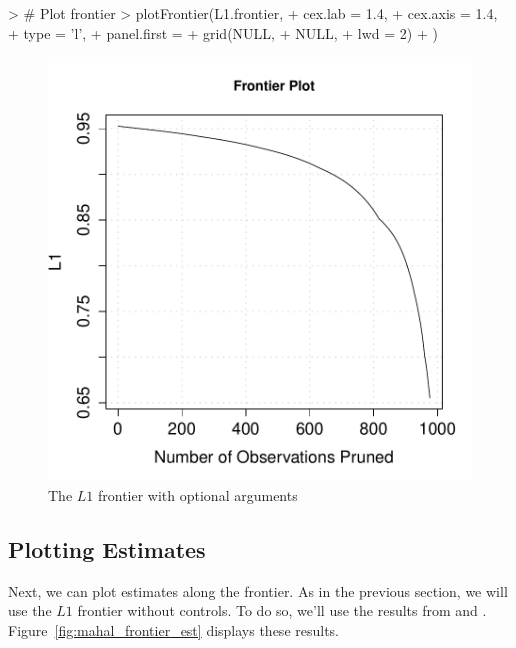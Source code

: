 \documentclass[nojss]{jss}
\begin{document}
\begin{minipage}{0.45\textwidth}
\begin{Schunk}
\begin{Sinput}
> # Plot frontier
> plotFrontier(L1.frontier,
+              cex.lab = 1.4,
+              cex.axis = 1.4,
+              type = 'l',
+              panel.first = 
+                 grid(NULL, 
+                      NULL, 
+                      lwd = 2)
+              )
\end{Sinput}
\end{Schunk}
\end{minipage}
\begin{minipage}{0.5\textwidth}
\begin{figure}[H]
\includegraphics{Using_MatchingFrontier-mahal_frontier_pretty.pdf}
\caption{\label{fig:mahal_frontier_pretty} The $L1$ frontier with optional arguments}
\end{figure}
\end{minipage} \hfill

\subsection{Plotting Estimates}

Next, we can plot estimates along the frontier. As in the previous
section, we will use the $L1$ frontier without controls. To do so,
we'll use the results from  and
. Figure~\ref{fig:mahal_frontier_est} displays these
results.
\end{document}
